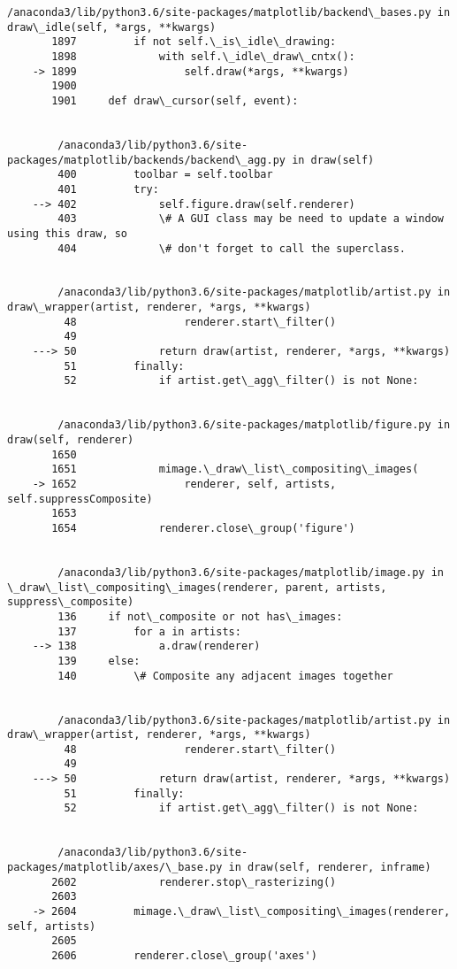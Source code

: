 \documentclass[11pt]{article}
\begin{document}
\begin{Verbatim}[commandchars=\\\{\}]
        /anaconda3/lib/python3.6/site-packages/matplotlib/backend\_bases.py in draw\_idle(self, *args, **kwargs)
       1897         if not self.\_is\_idle\_drawing:
       1898             with self.\_idle\_draw\_cntx():
    -> 1899                 self.draw(*args, **kwargs)
       1900 
       1901     def draw\_cursor(self, event):


        /anaconda3/lib/python3.6/site-packages/matplotlib/backends/backend\_agg.py in draw(self)
        400         toolbar = self.toolbar
        401         try:
    --> 402             self.figure.draw(self.renderer)
        403             \# A GUI class may be need to update a window using this draw, so
        404             \# don't forget to call the superclass.


        /anaconda3/lib/python3.6/site-packages/matplotlib/artist.py in draw\_wrapper(artist, renderer, *args, **kwargs)
         48                 renderer.start\_filter()
         49 
    ---> 50             return draw(artist, renderer, *args, **kwargs)
         51         finally:
         52             if artist.get\_agg\_filter() is not None:


        /anaconda3/lib/python3.6/site-packages/matplotlib/figure.py in draw(self, renderer)
       1650 
       1651             mimage.\_draw\_list\_compositing\_images(
    -> 1652                 renderer, self, artists, self.suppressComposite)
       1653 
       1654             renderer.close\_group('figure')


        /anaconda3/lib/python3.6/site-packages/matplotlib/image.py in \_draw\_list\_compositing\_images(renderer, parent, artists, suppress\_composite)
        136     if not\_composite or not has\_images:
        137         for a in artists:
    --> 138             a.draw(renderer)
        139     else:
        140         \# Composite any adjacent images together


        /anaconda3/lib/python3.6/site-packages/matplotlib/artist.py in draw\_wrapper(artist, renderer, *args, **kwargs)
         48                 renderer.start\_filter()
         49 
    ---> 50             return draw(artist, renderer, *args, **kwargs)
         51         finally:
         52             if artist.get\_agg\_filter() is not None:


        /anaconda3/lib/python3.6/site-packages/matplotlib/axes/\_base.py in draw(self, renderer, inframe)
       2602             renderer.stop\_rasterizing()
       2603 
    -> 2604         mimage.\_draw\_list\_compositing\_images(renderer, self, artists)
       2605 
       2606         renderer.close\_group('axes')



\end{Verbatim}
\end{document}
